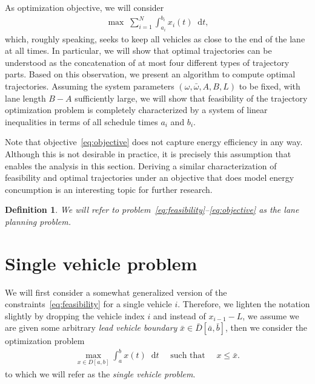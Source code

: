 \documentclass[a4paper]{article}
\theoremstyle{definition}
\theoremstyle{plain}
\newtheorem{define}{Definition\hspace{0.25em}\ignorespaces}
\newcommand*\diff{\mathop{}\!\mathrm{d}}
\begin{document}
As optimization objective, we will consider
\begin{align}\label{eq:objective}
  \max \; \sum_{i=1}^{N} \int_{a_{i}}^{b_{i}} x_{i}(t) \diff t ,
\end{align}
which, roughly speaking, seeks to keep all vehicles as close to the end of the
lane at all times.
%
In particular, we will show that optimal trajectories can be understood as the
concatenation of at most four different types of trajectory parts. Based on this
observation, we present an algorithm to compute optimal trajectories.
%
Assuming the system parameters $(\omega, \bar{\omega},A,B,L)$ to be fixed, with lane
length $B-A$ sufficiently large, we will show that feasibility of the trajectory
optimization problem is completely characterized by a system of linear
inequalities in terms of all schedule times $a_{i}$ and $b_{i}$.

Note that objective~\eqref{eq:objective} does not capture energy efficiency in
any way. Although this is not desirable in practice, it is precisely this
assumption that enables the analysis in this section. Deriving a similar
characterization of feasibility and optimal trajectories under an objective that
does model energy concumption is an interesting topic for further research.

\begin{define}
  We will refer to problem~\eqref{eq:feasibility}--\eqref{eq:objective} as the
  \emph{lane planning problem}.
\end{define}



\section{Single vehicle problem}

We will first consider a somewhat generalized version of the constraints~\eqref{eq:feasibility} for
a single vehicle $i$. Therefore, we lighten the notation slightly by dropping
the vehicle index $i$ and instead of $x_{i-1} - L$, we assume we are given some
arbitrary \emph{lead vehicle boundary} $\bar{x} \in \bar{D}[\bar{a}, \bar{b}]$, then we
consider the optimization problem
\begin{align}
  \max_{x \in D[a, b]} \int_{a}^{b} x(t) \diff t \quad \text{ such that } \quad x \leq \bar{x} .
\end{align}
to which we will refer as the \emph{single vehicle problem}.
\end{document}
